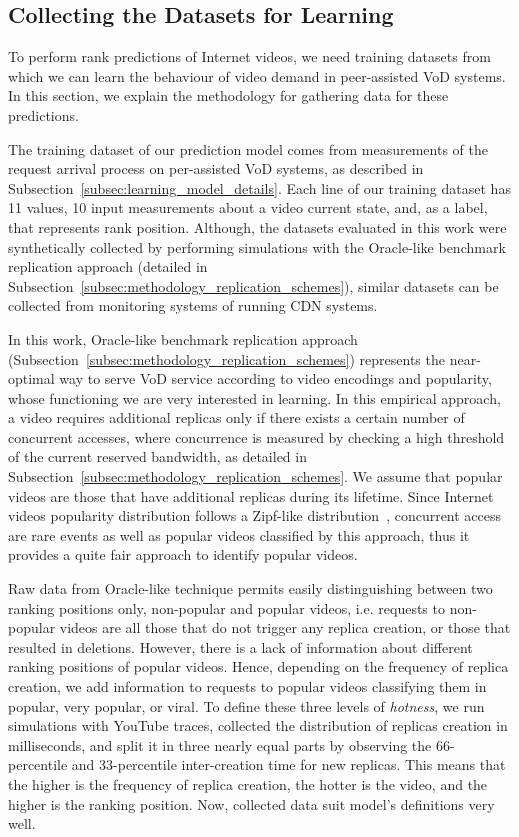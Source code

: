 \subsection{Collecting the Datasets for Learning}
\label{subsec:methodology_training_dataset}

To perform rank predictions of Internet videos, we need training datasets from which we can learn the behaviour of video demand in peer-assisted VoD systems. In this section, we explain the methodology for gathering data for these predictions. 

The training dataset of our prediction model comes from measurements of the request arrival process on per-assisted VoD systems, as described in Subsection~\ref{subsec:learning_model_details}. Each line of our training dataset has 11 values, 10 input measurements about a video current state, and, as a label, that represents rank position. Although, the datasets evaluated in this work were synthetically collected by performing simulations with the Oracle-like benchmark replication approach (detailed in Subsection~\ref{subsec:methodology_replication_schemes}), similar datasets can be collected from monitoring systems of running CDN systems.

In this work, Oracle-like benchmark replication approach (Subsection~\ref{subsec:methodology_replication_schemes}) represents the near-optimal way to serve VoD service according to video encodings and popularity, whose functioning we are very interested in learning. In this empirical approach, a video requires additional replicas only if there exists a certain number of concurrent accesses, where concurrence is measured by checking a high threshold of the current reserved bandwidth, as detailed in Subsection~\ref{subsec:methodology_replication_schemes}. We assume that popular videos are those that have additional replicas during its lifetime. Since Internet videos popularity distribution follows a Zipf-like distribution~\cite{popularity_prediction_2010}, concurrent access are rare events as well as popular videos classified by this approach, thus it provides a quite fair approach to identify popular videos. 

Raw data from Oracle-like technique permits easily distinguishing between two ranking positions only, non-popular and popular videos, i.e. requests to non-popular videos are all those that do not trigger any replica creation, or those that resulted in deletions. However, there is a lack of information about different ranking positions of popular videos. Hence, depending on the frequency of replica creation, we add information to requests to popular videos classifying them in popular, very popular, or viral. To define these three levels of \emph{hotness}, we run simulations with YouTube traces, collected the distribution of replicas creation in milliseconds, and split it in three nearly equal parts by observing the 66-percentile and 33-percentile inter-creation time for new replicas. This means that the higher is the frequency of replica creation, the hotter is the video, and the higher is the ranking position. Now, collected data suit model's definitions very well. 
